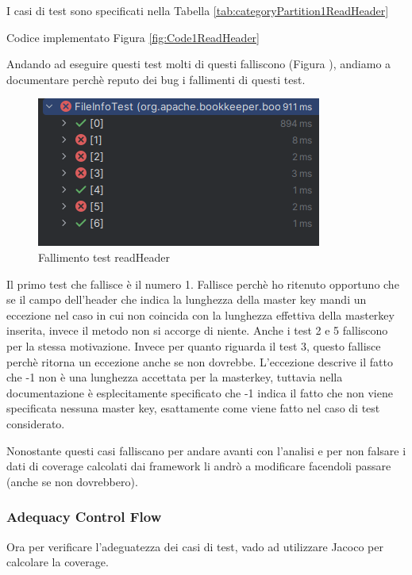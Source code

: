 \documentclass[12pt, a4paper]{article}
\begin{document}
I casi di test sono specificati nella Tabella \ref{tab:categoryPartition1ReadHeader}

Codice implementato Figura \ref{fig:Code1ReadHeader}


Andando ad eseguire questi test molti di questi falliscono (Figura ), andiamo a documentare perchè reputo 
dei bug i fallimenti di questi test.
\begin{figure}
  \includegraphics[width=\linewidth]{./images/file_info/TestFailsReadHeader.png}
  \caption{Fallimento test readHeader}
  \label{fig:TestFailsReadHeader}
\end{figure}

Il primo test che fallisce è il numero 1. Fallisce perchè ho ritenuto opportuno che se il campo dell'header 
che indica la lunghezza della master key mandi un eccezione nel caso in cui non coincida con la lunghezza effettiva 
della masterkey inserita, invece il metodo non si accorge di niente.
Anche i test 2 e 5 falliscono per la stessa motivazione. 
Invece per quanto riguarda il test 3, questo fallisce perchè ritorna un eccezione anche se non dovrebbe. 
L'eccezione descrive il fatto che -1 non è una lunghezza accettata per la masterkey, tuttavia nella documentazione è
esplecitamente specificato che -1 indica il fatto che non viene specificata nessuna master key, esattamente come viene 
fatto nel caso di test considerato.

Nonostante questi casi falliscano per andare avanti con l'analisi e per non falsare i dati di coverage calcolati
dai framework li andrò a modificare facendoli passare (anche se non dovrebbero).


\subsubsection{Adequacy Control Flow}
Ora per verificare l'adeguatezza dei casi di test, vado ad utilizzare
Jacoco per calcolare la coverage.
\end{document}
